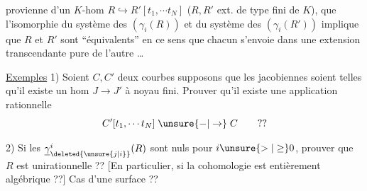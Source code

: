 provienne d'un $K$-hom $R\mathrel{\hookrightarrow}R'[t_1,\dotsb t_N]$ ($R,R'$ ext. de type fini de $K$), que l'isomorphie du système des $(\gamma_i(R))$ et du système des $(\gamma_i(R'))$ implique que $R$ et $R'$ sont ``équivalents'' en ce sens que chacun s'envoie dans une extension transcendante pure de l'autre \dots

\uline{Exemples} 1) Soient $C,C'$ deux courbes   supposons que les jacobiennes soient telles qu'il existe un hom $J\longrightarrow J'$ à noyau fini. Prouver qu'il existe  une application rationnelle 
\[
C'[t_1,\dotsb t_N]\mathrel{\unsure{-|\to}}C\qquad??
\]

2) Si les $\underline{\gamma}^{i}_{\deleted{\unsure{j|i}}}(R)$ sont nuls pour $i\unsure{>| \geq}0$, prouver que $R$ est unirationnelle ?? [En particulier, si la cohomologie  est entièrement algébrique ??] Cas d'une surface ?? \inserted{[cl. alg. !]}
